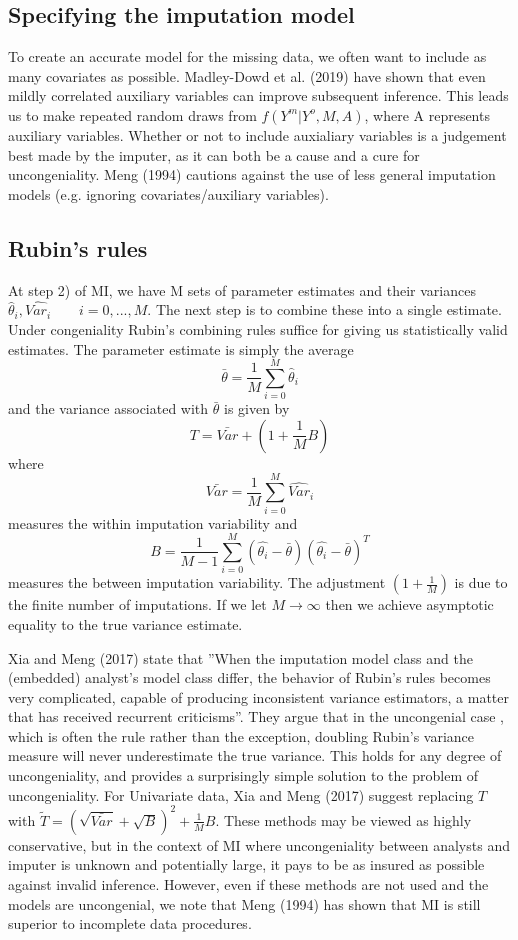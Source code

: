 \documentclass{article}
\begin{document}
	
	\subsection{Specifying the imputation model}
	
	To create an accurate model for the missing data, we often want to include as many covariates as possible. Madley-Dowd et al. (2019) have shown that even mildly correlated auxiliary variables can improve subsequent inference. This leads us to make repeated random draws from $f(Y^{m}|Y^{o}, M, A)$, where A represents auxiliary variables. Whether or not to include auxialiary variables is a judgement best made by the imputer, as it can both be a cause and a cure for uncongeniality. Meng (1994) cautions against the use of less general imputation models (e.g. ignoring covariates/auxiliary variables).
	
	\subsection{Rubin's rules}
	
	At step 2) of MI, we have M sets of parameter estimates and their variances $\hat{\theta}_{i},\hat{Var_{i}} \qquad i=0,...,M$. The next step is to combine these into a single estimate. Under congeniality Rubin's combining rules suffice for giving us statistically valid estimates. The parameter estimate is simply the average $$\bar{\theta} = \frac{1}{M}\sum_{i=0}^{M}\hat{\theta}_{i}$$ and the variance associated with $\bar{\theta}$ is given by $$T = \bar{Var}+(1+\frac{1}{M}B)$$ where $$\bar{Var} = \frac{1}{M}\sum_{i=0}^{M}\hat{Var}_{i}$$ measures the within imputation variability and $$B = \frac{1}{M-1}\sum_{i=0}^{M}(\hat{\theta_{i}}-\bar{\theta})(\hat{\theta_{i}}-\bar{\theta})^{T}$$ measures the between imputation variability. The adjustment $(1+\frac{1}{M})$ is due to the finite number of imputations. If we let $M\rightarrow\infty$ then we achieve asymptotic equality to the true variance estimate.
	
	Xia and Meng (2017) state that ''When the imputation model class and the (embedded) analyst’s model class
	differ, the behavior of Rubin’s rules becomes very complicated, capable of producing inconsistent variance estimators, a matter that has received recurrent
	criticisms''. They argue that in the uncongenial case , which is often the rule rather than the exception, doubling Rubin's variance measure will never underestimate the true variance. This holds for any degree of uncongeniality, and provides a surprisingly simple solution to the problem of uncongeniality. For Univariate data, Xia and Meng (2017) suggest replacing $T$ with $\tilde{T}= (\sqrt{\bar{Var}}+\sqrt{B})^{2}+\frac{1}{M}B$. These methods may be viewed as highly conservative, but in the context of MI where uncongeniality between analysts and imputer is unknown and potentially large, it pays to be as insured as possible against invalid inference. However, even if these methods are not used and the models are uncongenial, we note that Meng (1994) has shown that MI is still superior to incomplete data procedures.
	
\end{document}
